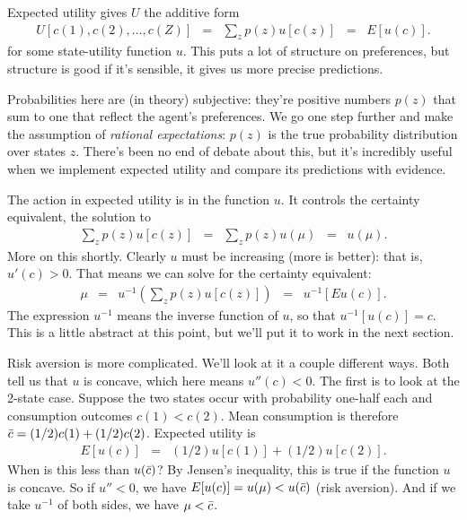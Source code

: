 Expected utility gives $U$ the additive form
\begin{eqnarray}
    U [c(1), c(2), \ldots, c(Z)]
            &=& \sum_z p(z) u[c(z)]  \;\;=\;\;  E [u(c)] .
\end{eqnarray}
for some state-utility function $u$.
This puts a lot of structure on preferences,
but structure is good if it's sensible,
it gives us more precise predictions.


Probabilities here are (in theory) subjective:
they're positive numbers $p(z)$ that sum to one that reflect
the agent's preferences.
We go one step further and make the assumption
of {\it rational expectations\/}:
$p(z)$ is the true probability distribution over states $z$.
There's been no end of debate about this,
but it's incredibly useful when we implement
expected utility and compare its predictions with evidence.


The action in expected utility is in the function $u$.
It controls the certainty equivalent, the solution to
\begin{eqnarray*}
    \sum_z p(z) u[c(z)]
        &=&  \sum_z p(z) u(\mu)  \;\;=\;\; u(\mu) .
\end{eqnarray*}
More on this shortly.
Clearly $u$ must be increasing (more is better):
that is, $u'(c) > 0$.
That means we can solve for the certainty equivalent:
\begin{eqnarray*}
    \mu &=& u^{-1} \left( \sum_z p(z) u[c(z)] \right)
        \;\;=\;\; u^{-1} \left[ E u(c) \right] .
\end{eqnarray*}
The expression $u^{-1}$ means the inverse function of $u$,
so that $u^{-1} [u(c)] = c $.
This is a little abstract at this point, but we'll put it to work
in the next section.


Risk aversion is more complicated.
We'll look at it a couple different ways.
Both tell us that $u$ is concave,
which here means  $u''(c) < 0$.
The first is to look at the 2-state case.
Suppose the two states occur with probability one-half each
and consumption outcomes $c(1) < c(2)$.
Mean consumption is therefore $ \bar{c} = (1/2)c(1) + (1/2) c(2)$.
Expected utility is
\begin{eqnarray*}
    E [u(c)] &=&  (1/2) u[c(1)] + (1/2) u[c(2)] .
\end{eqnarray*}
When is this less than $u(\bar{c})$?
By Jensen's inequality, this is true if the function $u$ is concave.
So if $u'' < 0$, we have $E[u(c)] = u(\mu) < u(\bar{c})$ (risk aversion).
And if we take $u^{-1}$ of both sides, we have
$\mu < \bar{c}$.

